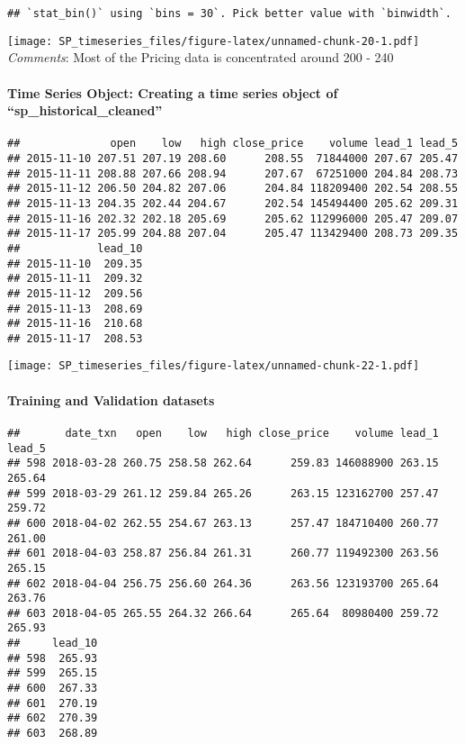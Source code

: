 \documentclass[]{article}
\let\oldparagraph\paragraph
\renewcommand{\paragraph}[1]{\oldparagraph{#1}\mbox{}}
\begin{document}
\begin{verbatim}
## `stat_bin()` using `bins = 30`. Pick better value with `binwidth`.
\end{verbatim}

\texttt{[image: SP\_timeseries\_files/figure-latex/unnamed-chunk-20-1.pdf]}
\emph{Comments}: Most of the Pricing data is concentrated around 200 -
240

\paragraph{\texorpdfstring{Time Series Object: Creating a time series
object of
``sp\_historical\_cleaned''}{Time Series Object: Creating a time series object of sp\_historical\_cleaned}}\label{time-series-object-creating-a-time-series-object-of-sp_historical_cleaned}

\begin{verbatim}
##              open    low   high close_price    volume lead_1 lead_5
## 2015-11-10 207.51 207.19 208.60      208.55  71844000 207.67 205.47
## 2015-11-11 208.88 207.66 208.94      207.67  67251000 204.84 208.73
## 2015-11-12 206.50 204.82 207.06      204.84 118209400 202.54 208.55
## 2015-11-13 204.35 202.44 204.67      202.54 145494400 205.62 209.31
## 2015-11-16 202.32 202.18 205.69      205.62 112996000 205.47 209.07
## 2015-11-17 205.99 204.88 207.04      205.47 113429400 208.73 209.35
##            lead_10
## 2015-11-10  209.35
## 2015-11-11  209.32
## 2015-11-12  209.56
## 2015-11-13  208.69
## 2015-11-16  210.68
## 2015-11-17  208.53
\end{verbatim}

\texttt{[image: SP\_timeseries\_files/figure-latex/unnamed-chunk-22-1.pdf]}

\paragraph{Training and Validation
datasets}\label{training-and-validation-datasets}

\begin{verbatim}
##       date_txn   open    low   high close_price    volume lead_1 lead_5
## 598 2018-03-28 260.75 258.58 262.64      259.83 146088900 263.15 265.64
## 599 2018-03-29 261.12 259.84 265.26      263.15 123162700 257.47 259.72
## 600 2018-04-02 262.55 254.67 263.13      257.47 184710400 260.77 261.00
## 601 2018-04-03 258.87 256.84 261.31      260.77 119492300 263.56 265.15
## 602 2018-04-04 256.75 256.60 264.36      263.56 123193700 265.64 263.76
## 603 2018-04-05 265.55 264.32 266.64      265.64  80980400 259.72 265.93
##     lead_10
## 598  265.93
## 599  265.15
## 600  267.33
## 601  270.19
## 602  270.39
## 603  268.89
\end{verbatim}
\end{document}
